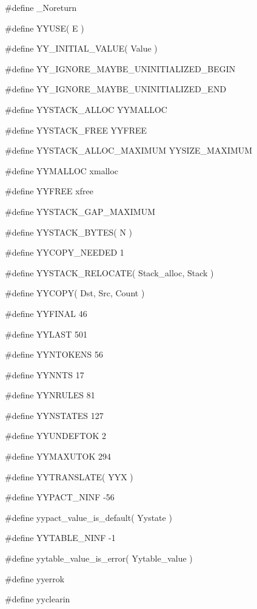 \medskip
{\stt \#define \_Noreturn}

\medskip
{\stt \#define YYUSE( E )}

\medskip
{\stt \#define YY\_INITIAL\_VALUE( Value )}

\medskip
{\stt \#define YY\_IGNORE\_MAYBE\_UNINITIALIZED\_BEGIN}

\medskip
{\stt \#define YY\_IGNORE\_MAYBE\_UNINITIALIZED\_END}

\medskip
{\stt \#define YYSTACK\_ALLOC YYMALLOC}

\medskip
{\stt \#define YYSTACK\_FREE YYFREE}

\medskip
{\stt \#define YYSTACK\_ALLOC\_MAXIMUM YYSIZE\_MAXIMUM}

\medskip
{\stt \#define YYMALLOC xmalloc}

\medskip
{\stt \#define YYFREE xfree}

\medskip
{\stt \#define YYSTACK\_GAP\_MAXIMUM}

\medskip
{\stt \#define YYSTACK\_BYTES( N )}

\medskip
{\stt \#define YYCOPY\_NEEDED 1}

\medskip
{\stt \#define YYSTACK\_RELOCATE( Stack\_alloc, Stack )}

\medskip
{\stt \#define YYCOPY( Dst, Src, Count )}

\medskip
{\stt \#define YYFINAL 46}

\medskip
{\stt \#define YYLAST 501}

\medskip
{\stt \#define YYNTOKENS 56}

\medskip
{\stt \#define YYNNTS 17}

\medskip
{\stt \#define YYNRULES 81}

\medskip
{\stt \#define YYNSTATES 127}

\medskip
{\stt \#define YYUNDEFTOK 2}

\medskip
{\stt \#define YYMAXUTOK 294}

\medskip
{\stt \#define YYTRANSLATE( YYX )}

\medskip
{\stt \#define YYPACT\_NINF -56}

\medskip
{\stt \#define yypact\_value\_is\_default( Yystate )}

\medskip
{\stt \#define YYTABLE\_NINF -1}

\medskip
{\stt \#define yytable\_value\_is\_error( Yytable\_value )}

\medskip
{\stt \#define yyerrok}

\medskip
{\stt \#define yyclearin}

